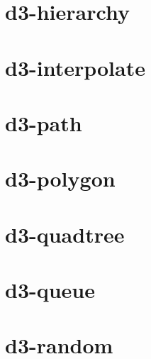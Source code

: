 \documentclass[twoside]{book}
\newcommand{\+}{\discretionary{\mbox{\scriptsize$\hookleftarrow$}}{}{}}
\begin{document}
\chapter{d3-\/hierarchy}
\label{md_dsmacc_examples_DRmerge_node_modules_d3-hierarchy_README}

\chapter{d3-\/interpolate}
\label{md_dsmacc_examples_DRmerge_node_modules_d3-interpolate_README}

\chapter{d3-\/path}
\label{md_dsmacc_examples_DRmerge_node_modules_d3-path_README}

\chapter{d3-\/polygon}
\label{md_dsmacc_examples_DRmerge_node_modules_d3-polygon_README}

\chapter{d3-\/quadtree}
\label{md_dsmacc_examples_DRmerge_node_modules_d3-quadtree_README}

\chapter{d3-\/queue}
\label{md_dsmacc_examples_DRmerge_node_modules_d3-queue_README}

\chapter{d3-\/random}
\label{md_dsmacc_examples_DRmerge_node_modules_d3-random_README}

\end{document}
